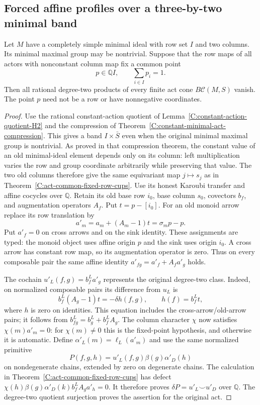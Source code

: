 \subsection{Forced affine profiles over a three-by-two minimal band}

\begin{proposition}
\label{C:act-common-affine-origin-cups}
Let $M$ have a completely simple minimal ideal with row set $I$
and two columns.  Its minimal maximal group may be nontrivial.
Suppose that the row maps of all actors with nonconstant column
map fix a common point
\[
 p\in\mathbb QI,\qquad \sum_{i\in I}p_i=1.
\]
Then all rational degree-two products of every finite act cone
$B\mathcal C(M,S)$ vanish.  The point $p$ need not be a row or
have nonnegative coordinates.
\end{proposition}
\begin{proof}
Use the rational constant-action quotient of
Lemma~\ref{C:constant-action-quotient-H2} and the compression of
Theorem~\ref{C:constant-minimal-act-compression}.
This gives a band $I\times\bar S$ even when the original
minimal maximal group is nontrivial.  As proved in that
compression theorem, the constant value of an old minimal-ideal
element depends only on its column: left multiplication varies
the row and group coordinate arbitrarily while preserving that
value.  The two old columns therefore give the same equivariant
map $j\mapsto s_j$ as in
Theorem~\ref{C:act-common-fixed-row-cups}.
Use its honest Karoubi transfer and affine cocycles over
$\mathbb Q$.
Retain its old base row $i_0$, base column $s_0$, covectors $b_f$,
and augmentation operators $A_f$.  Put $t=p-[i_0]$.
For an old monoid arrow replace its row translation by
\[
 a'_m=a_m+(A_m-1)t=\sigma_m p-p.
\]
Put $a'_f=0$ on cross arrows and on the sink identity.  These
assignments are typed: the monoid object uses affine origin $p$
and the sink uses origin $i_0$.  A cross arrow has constant row
map, so its augmentation operator is zero.  Thus on every
composable pair the same affine identity
$a'_{fg}=a'_f+A_fa'_g$ holds.

The cochain $u'_L(f,g)=b^L_fa'_g$ represents the original
degree-two class.  Indeed, on normalized composable pairs its
difference from $u_L$ is
\[
 b^L_f(A_g-1)t=-\delta h(f,g),\qquad h(f)=b^L_ft,
\]
where $h$ is zero on identities.  This equation includes the
cross-arrow/old-arrow pairs; it follows from
$b^L_{fg}=b^L_g+b^L_fA_g$.
The column character $\chi$ now satisfies
$\chi(m)a'_m=0$: for $\chi(m)\ne0$ this is the fixed-point
hypothesis, and otherwise it is automatic.
Define $\alpha'_L(m)=\ell_L(a'_m)$ and use the same normalized
primitive
\[
 P(f,g,h)=u'_L(f,g)\beta(g)\alpha'_D(h)
\]
on nondegenerate chains, extended by zero on degenerate chains.
The calculation in Theorem~\ref{C:act-common-fixed-row-cups}
has defect
$\chi(h)\beta(g)\alpha'_D(k)b^L_fA_ga'_h=0$.
It therefore proves $\delta P=u'_L\smile u'_D$ over
$\mathbb Q$.  The degree-two quotient surjection proves the
assertion for the original act.
\end{proof}

